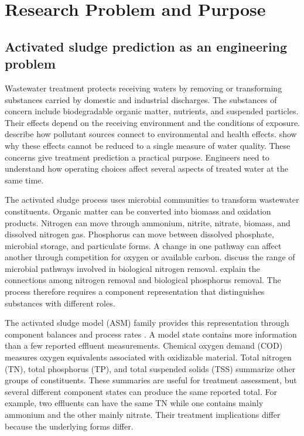 \chapter{Research Problem and Purpose}
\label{ch:introduction}

\section{Activated sludge prediction as an engineering problem}

Wastewater treatment protects receiving waters by removing or transforming substances carried by domestic and industrial discharges. The substances of concern include biodegradable organic matter, nutrients, and suspended particles. Their effects depend on the receiving environment and the conditions of exposure. \citet{Madhav2019} describe how pollutant sources connect to environmental and health effects. \citet{Lin2022} show why these effects cannot be reduced to a single measure of water quality. These concerns give treatment prediction a practical purpose. Engineers need to understand how operating choices affect several aspects of treated water at the same time.

The activated sludge process uses microbial communities to transform wastewater constituents. Organic matter can be converted into biomass and oxidation products. Nitrogen can move through ammonium, nitrite, nitrate, biomass, and dissolved nitrogen gas. Phosphorus can move between dissolved phosphate, microbial storage, and particulate forms. A change in one pathway can affect another through competition for oxygen or available carbon. \citet{Duan2022} discuss the range of microbial pathways involved in biological nitrogen removal. \citet{Wentzel1992} explain the connections among nitrogen removal and biological phosphorus removal. The process therefore requires a component representation that distinguishes substances with different roles.

The activated sludge model (ASM) family provides this representation through component balances and process rates \citep{Henze1999,Henze2006}. A model state contains more information than a few reported effluent measurements. Chemical oxygen demand (COD) measures oxygen equivalents associated with oxidizable material. Total nitrogen (TN), total phosphorus (TP), and total suspended solids (TSS) summarize other groups of constituents. These summaries are useful for treatment assessment, but several different component states can produce the same reported total. For example, two effluents can have the same TN while one contains mainly ammonium and the other mainly nitrate. Their treatment implications differ because the underlying forms differ.

